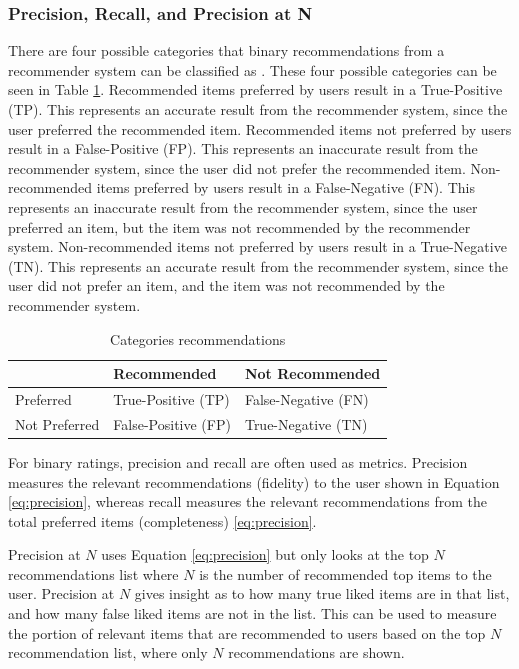 \subsubsection{Precision, Recall, and Precision at N} \label{precision}

There are four possible categories that binary recommendations from a recommender system can be classified as \cite{zhang}. These four possible categories can be seen in Table \ref{table:categories}. Recommended items preferred by users result in a True-Positive (TP). This represents an accurate result from the recommender system, since the user preferred the recommended item. Recommended items not preferred by users result in a False-Positive (FP). This represents an inaccurate result from the recommender system, since the user did not prefer the recommended item. Non-recommended items preferred by users result in a False-Negative (FN). This represents an inaccurate result from the recommender system, since the user preferred an item, but the item was not recommended by the recommender system. Non-recommended items not preferred by users result in a True-Negative (TN). This represents an accurate result from the recommender system, since the user did not prefer an item, and the item was not recommended by the recommender system.

\begin{table}[h!]
\centering
\begin{tabular}{|l|l|l|} 
     \hline
      & Recommended & Not Recommended \\ [0.5ex] 
     \hline
     Preferred & True-Positive (TP) & False-Negative (FN)\\
     \hline
     Not Preferred & False-Positive (FP) & True-Negative (TN) \\
     \hline
\end{tabular}
\caption{Categories recommendations}
\label{table:categories}
\end{table}

For binary ratings, precision and recall are often used as metrics. Precision measures the relevant recommendations (fidelity) to the user shown in Equation \ref{eq:precision}, whereas recall measures the relevant recommendations from the total preferred items (completeness) \ref{eq:precision}. 

Precision at $N$ uses Equation \ref{eq:precision} but only looks at the top $N$ recommendations list where $N$ is the number of recommended top items to the user. Precision at $N$ gives insight as to how many true liked items are in that list, and how many false liked items are not in the list. This can be used to measure the portion of relevant items that are recommended to users based on the top $N$ recommendation list, where only $N$ recommendations are shown.

